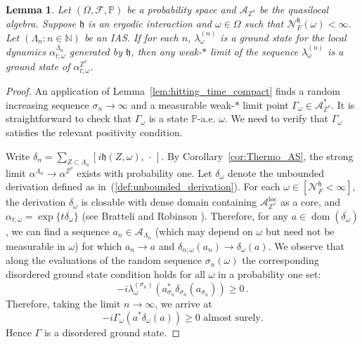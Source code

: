 \documentclass{article}
\newcommand{\calN}{\mathcal{N}^{\mathfrak{h}}_F}
\DeclareMathOperator{\dom}{dom}
\newcommand{\Znu}{\mathbb{Z}^\nu}
\newcommand{\A}{\mathcal{A}}
\newcommand{\N}{\mathbb N}
\renewcommand{\P}{\mathbb{P}}
\DeclareMathOperator{\loc}{loc}
\newcommand{\<}{\langle}
\renewcommand{\>}{\rangle}
\newcommand{\h}{\mathfrak{h}}
\newtheorem{lem}[thm]{Lemma}
\theoremstyle{definition}
\numberwithin{equation}{section}
\begin{document}
\begin{lem}\label{lem:gs}
	Let $(\Omega, \mathcal{F}, \P)$ be a probability space and $\A_{\Znu}$ be the quasilocal algebra. Suppose $\h$ is an ergodic interaction and $\omega\in \Omega$ such that  $\calN(\omega)<\infty$. Let $(\Lambda_n \colon n\in \N)$ be an IAS. If for each $n$, $\lambda^{(n)}_\omega$ is a ground state for the local dynamics $\alpha^{\Lambda_n}_{t;\omega}$ generated by $\h$, then any weak-$\ast$ limit of the sequence $\lambda^{(n)}_\omega$ is a ground state of $\alpha^{\Znu}_{t;\omega}$. 
\end{lem}
\begin{proof}
An application of Lemma~\ref{lem:hitting_time_compact} finds a random increasing sequence $\sigma_n \to \infty$ and a measurable weak-$\ast$ limit point $\Gamma_{\omega}\in\A_{\Znu}^*$. It is straightforward to check that $\Gamma_\omega$ is a state $\P$-a.e. $\omega$.  We need to verify that $\Gamma_{\omega}$ satisfies the relevant positivity condition. 

Write $\delta_n = \sum_{Z\subset \Lambda_n} [i\h(Z,\omega), \,\cdot \,].$ By Corollary~\ref{cor:Thermo_AS}, the strong limit $\alpha^{\Lambda_n} \to \alpha^{\Znu}$ exists with probability one. Let $\delta_\omega$ denote the unbounded derivation defined as in~(\ref{def:unbounded_derivation}). 
    For each $\omega\in [\calN <\infty]$, the derivation $\delta_\omega$ is closable with dense domain containing $\A^{\loc}_{\Znu}$ as a core, and $\alpha_{t;\omega} = \exp\{t \overline{\delta_\omega}\}$ (see Bratteli and Robinson \cite[Proposition 3.2.22, Example 3.2.25]{BratteliRobinsonI}). Therefore, for any $a\in \dom(\overline{\delta_\omega})$, we can find a sequence  $a_n\in \A_{\Lambda_n}$ (which may depend on $\omega$ but need not be measurable in $\omega$) for which $a_n \to a$ and $\delta_{n;\omega}(a_n) \to \delta_{\omega}(a)$.  We observe that along the evaluations of the random sequence $\sigma_n(\omega)$ the corresponding disordered ground state condition holds for all $\omega$ in a probability one set: 
    \begin{equation}\label{eqn:pf:ARS_local}
         -i\lambda^{(\sigma_n)}_{\omega}(a^*_{\sigma_n}\delta_{\sigma_n}(a_{\sigma_n})) \ge0\,.
    \end{equation}Therefore, taking the limit $n\to \infty$, we arrive at 
    \[
        -i\Gamma_\omega(a^*\delta_\omega(a)) \ge 0 \text{ almost surely}.
    \] Hence $\Gamma$ is a disordered ground state.
\end{proof}
\end{document}
